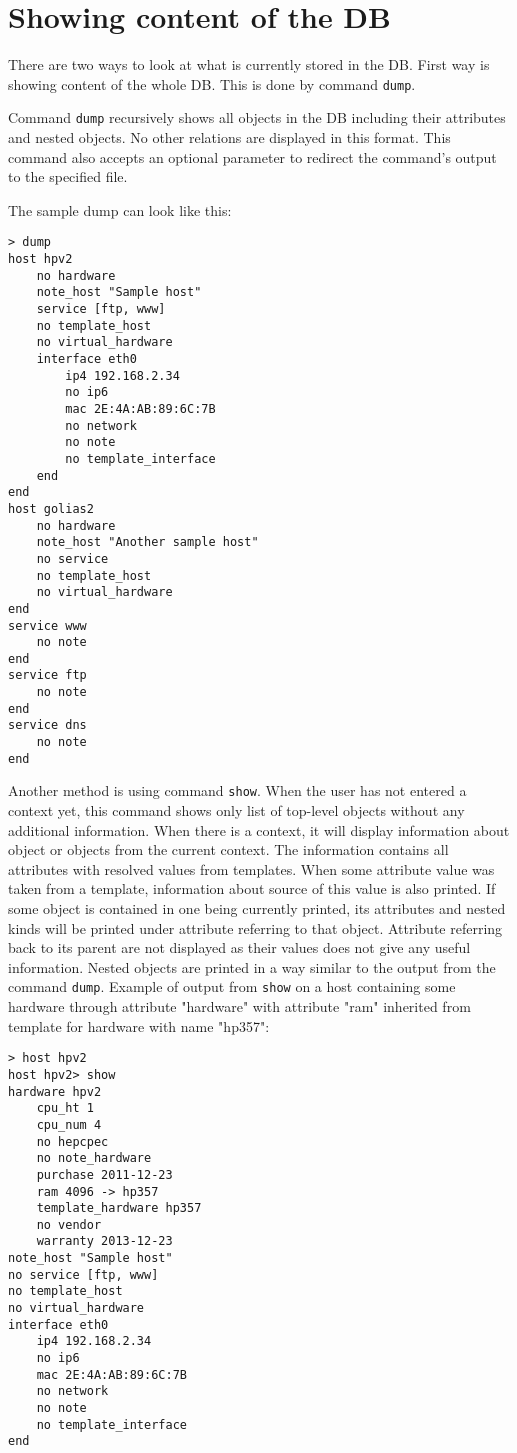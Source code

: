 \documentclass[deska]{subfiles}
\begin{document}
\section{Showing content of the DB}

There are two ways to look at what is currently stored in the DB. First way is showing content of the whole DB. This
is done by command {\tt dump}.

Command {\tt dump} recursively shows all objects in the DB including their attributes and nested objects. No other
relations are displayed in this format. This command also accepts an optional parameter to redirect the command's output
to the specified file.

The sample dump can look like this:
\begin{verbatim}
> dump
host hpv2
    no hardware
    note_host "Sample host"
    service [ftp, www]
    no template_host
    no virtual_hardware
    interface eth0
        ip4 192.168.2.34
        no ip6
        mac 2E:4A:AB:89:6C:7B
        no network
        no note
        no template_interface
    end
end
host golias2
    no hardware
    note_host "Another sample host"
    no service
    no template_host
    no virtual_hardware
end
service www
    no note
end
service ftp
    no note
end
service dns
    no note
end
\end{verbatim}

Another method is using command {\tt show}. When the user has not entered a context yet, this command shows only list of top-level objects without any
additional information. When there is a context, it will display information about object or objects from the current context. The
information contains all attributes with resolved values from templates. When some attribute value was taken from
a template, information about source of this value is also printed. If some object is contained in one being currently
printed, its attributes and nested kinds will be printed under attribute referring to that object. Attribute referring back to its parent
are not displayed as their values does not give any useful information. Nested objects are printed in a way similar to the output from the
command {\tt dump}. Example of output from {\tt show} on a host containing some hardware through attribute "hardware" with attribute "ram"
inherited from template for hardware with name "hp357":

\begin{verbatim}
> host hpv2
host hpv2> show
hardware hpv2
    cpu_ht 1
    cpu_num 4
    no hepcpec
    no note_hardware
    purchase 2011-12-23
    ram 4096 -> hp357
    template_hardware hp357
    no vendor
    warranty 2013-12-23
note_host "Sample host"
no service [ftp, www]
no template_host
no virtual_hardware
interface eth0
    ip4 192.168.2.34
    no ip6
    mac 2E:4A:AB:89:6C:7B
    no network
    no note
    no template_interface
end
\end{verbatim}
\end{document}
